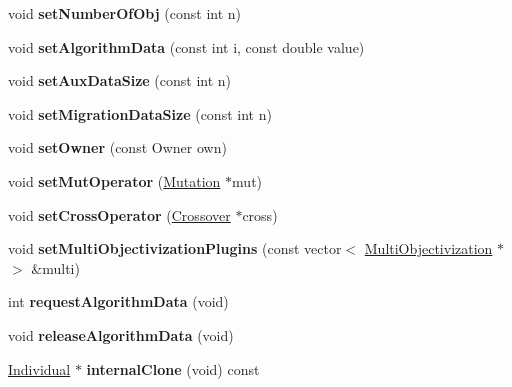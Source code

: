 \begin{DoxyCompactItemize}
void {\bfseries set\+Number\+Of\+Obj} (const int n)
\item 
\mbox{\label{classIndividual_a34e31746ea41d0dfae4e780175e227ec}} 
void {\bfseries set\+Algorithm\+Data} (const int i, const double value)
\item 
\mbox{\label{classIndividual_afcee9a2a14bce879233127de7052c04d}} 
void {\bfseries set\+Aux\+Data\+Size} (const int n)
\item 
\mbox{\label{classIndividual_af5b4c849207df6d0633f4860af0c3cd1}} 
void {\bfseries set\+Migration\+Data\+Size} (const int n)
\item 
\mbox{\label{classIndividual_ab562578d64333b00ccd0e20fd079e3d2}} 
void {\bfseries set\+Owner} (const Owner own)
\item 
\mbox{\label{classIndividual_a5176a4131d6bceb7e84280f84a623ff0}} 
void {\bfseries set\+Mut\+Operator} (\mbox{\hyperlink{classMutation}{Mutation}} $\ast$mut)
\item 
\mbox{\label{classIndividual_a790e135b019ce331cb9e1270193c3313}} 
void {\bfseries set\+Cross\+Operator} (\mbox{\hyperlink{classCrossover}{Crossover}} $\ast$cross)
\item 
\mbox{\label{classIndividual_ac9d4ad0bf7bd5bebbc6e13bc2090bfea}} 
void {\bfseries set\+Multi\+Objectivization\+Plugins} (const vector$<$ \mbox{\hyperlink{classMultiObjectivization}{Multi\+Objectivization}} $\ast$$>$ \&multi)
\item 
\mbox{\label{classIndividual_ac51b9b06ff8b7ad2b8b3e3138e53e875}} 
int {\bfseries request\+Algorithm\+Data} (void)
\item 
\mbox{\label{classIndividual_af97490ce47977903aaf34b6af0d8c410}} 
void {\bfseries release\+Algorithm\+Data} (void)
\item 
\mbox{\label{classIndividual_a519dab6ca141dd139a0676c8f27e5e98}} 
\mbox{\hyperlink{classIndividual}{Individual}} $\ast$ {\bfseries internal\+Clone} (void) const
\item 
$$
\end{DoxyCompactItemize}
